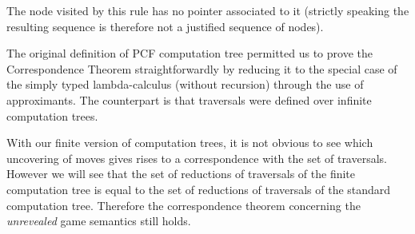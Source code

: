 \documentclass{article}
\begin{document}
The node visited by this rule has no pointer associated to it (strictly speaking the resulting sequence is therefore not a justified sequence of nodes).




The original definition of PCF computation tree permitted us to prove the Correspondence Theorem straightforwardly by reducing it to the special case of the simply typed lambda-calculus (without recursion) through the use of approximants. The counterpart is that traversals were defined over infinite computation trees.

With our finite version of computation trees, it is not obvious to see which uncovering of moves gives rises to a correspondence with the set of traversals.
However we will see that the set of reductions of traversals of the finite computation tree is equal to the set of reductions of  traversals of the standard computation tree.
Therefore the correspondence theorem concerning the \emph{unrevealed} game semantics still holds.

%
%
%
%
%
%
%
\end{document}
